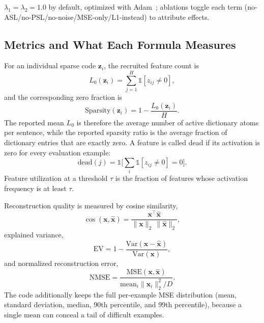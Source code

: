 \documentclass[conference]{IEEEtran}
\begin{document}
$\lambda_1=\lambda_2=1.0$ by default, optimized with
Adam~\cite{kingma2015adam}; ablations toggle each term
(no-ASL/no-PSL/no-noise/MSE-only/L1-instead) to attribute effects.

\subsection{Metrics and What Each Formula Measures}
For an individual sparse code $\mathbf{z}_i$, the recruited feature count
is
\begin{equation}
L_0(\mathbf{z}_i) = \sum_{j=1}^{H} \mathbb{1}[z_{ij}\ne 0],
\label{eq:l0}
\end{equation}
and the corresponding zero fraction is
\begin{equation}
\mathrm{Sparsity}(\mathbf{z}_i) = 1 - \frac{L_0(\mathbf{z}_i)}{H}.
\label{eq:sparsity}
\end{equation}
The reported mean $L_0$ is therefore the average number of active
dictionary atoms per sentence, while the reported sparsity ratio is the
average fraction of dictionary entries that are exactly zero. A feature is
called dead if its activation is zero for every evaluation example:
\begin{equation}
\mathrm{dead}(j) = \mathbb{1}\Big[\textstyle\sum_i \mathbb{1}[z_{ij}\ne 0] = 0\Big].
\label{eq:dead}
\end{equation}
Feature utilization at a threshold $\tau$ is the fraction of features whose
activation frequency is at least $\tau$.

Reconstruction quality is measured by cosine similarity,
\begin{equation}
\cos(\mathbf{x},\hat{\mathbf{x}}) =
\frac{\mathbf{x}^{\top}\hat{\mathbf{x}}}{\|\mathbf{x}\|_2\,\|\hat{\mathbf{x}}\|_2},
\label{eq:cosine}
\end{equation}
explained variance,
\begin{equation}
\mathrm{EV} = 1 - \frac{\mathrm{Var}(\mathbf{x}-\hat{\mathbf{x}})}{\mathrm{Var}(\mathbf{x})},
\label{eq:ev}
\end{equation}
and normalized reconstruction error,
\begin{equation}
\mathrm{NMSE} = \frac{\mathrm{MSE}(\mathbf{x},\hat{\mathbf{x}})}
{\mathrm{mean}_i\|\mathbf{x}_i\|_2^2 / D}.
\label{eq:nmse}
\end{equation}
The code additionally keeps the full per-example MSE distribution (mean,
standard deviation, median, 90th percentile, and 99th percentile), because
a single mean can conceal a tail of difficult examples.
\end{document}
